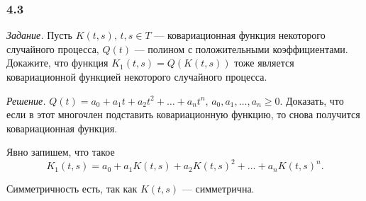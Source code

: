 \subsubsection*{4.3}

\textit{Задание.}
Пусть $K \left( t, s \right), \, t, s \in T$ ---
ковариационная функция некоторого случайного процесса, $Q \left( t \right) $ ---
полином с положительными коэффициентами.
Докажите, что функция $K_1 \left( t, s \right) = Q \left( K \left( t, s \right) \right) $
тоже является ковариационной функцией некоторого случайного процесса.

\textit{Решение.}
$Q \left( t \right) = a_0 + a_1 t + a_2 t^2 + \dotsc + a_n t^n, \, a_0, a_1, \dotsc, a_n \geq 0$.
Доказать, что если в этот многочлен подставить ковариационную функцию,
то снова получится ковариационная функция.

Явно запишем, что такое
$$K_1 \left( t, s \right) =
  a_0 + a_1 K \left( t, s \right) + a_2 K \left( t, s \right)^2 + \dotsc +
  a_n K \left( t, s \right)^n.$$

Симметричность есть, так как $K \left( t, s \right) $ --- симметрична.

